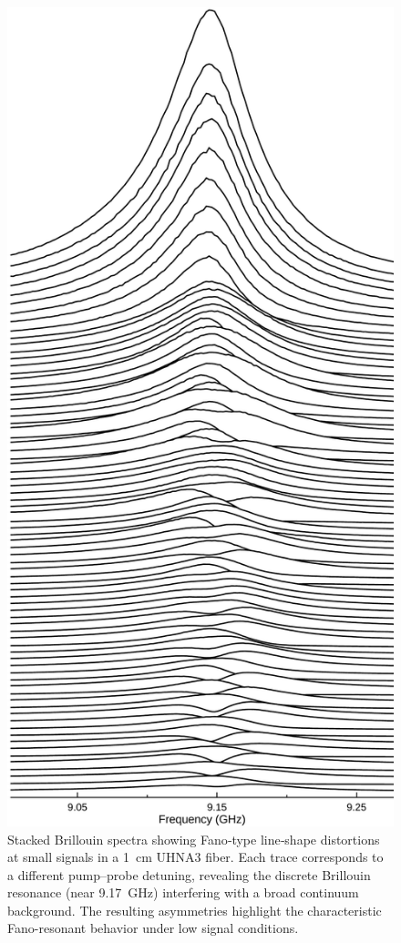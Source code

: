 \begin{figure}[ht]
\centering
\includegraphics[height=0.90\textheight]{figs/4-CABS/JoyDivisionCABSUHNA3.pdf}
\caption{Stacked Brillouin spectra showing Fano‐type line‐shape distortions at small signals in a \SI{1}{\centi\meter} UHNA3 fiber. Each trace corresponds to a different pump–probe detuning, revealing the discrete Brillouin resonance (near \SI{9.17}{\giga\hertz}) interfering with a broad continuum background. The resulting asymmetries highlight the characteristic Fano-resonant behavior under low signal conditions.}
\label{fig:Joy Division UHNA3}
\end{figure}

